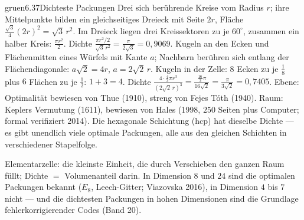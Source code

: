 \begin{loesungkarte}{gruen}{6.37}{Dichteste Packungen}
Drei sich berührende Kreise vom Radius $r$; ihre Mittelpunkte bilden ein gleichseitiges Dreieck mit Seite $2r$, Fläche $\frac{\sqrt3}4(2r)^{2} = \sqrt3\,r^{2}$. Im Dreieck liegen drei Kreissektoren zu je $60^{\circ}$, zusammen ein halber Kreis: $\frac{\pi r^{2}}2$. Dichte $\frac{\pi r^{2}/2}{\sqrt3\,r^{2}} = \frac\pi{2\sqrt3} = 0{,}9069$.
Kugeln an den Ecken und Flächenmitten eines Würfels mit Kante $a$; Nachbarn berühren sich entlang der Flächendiagonale: $a\sqrt2 = 4r$, $a = 2\sqrt2\,r$. Kugeln in der Zelle: $8$ Ecken zu je $\frac18$ plus $6$ Flächen zu je $\frac12$: $1 + 3 = 4$. Dichte $\frac{4\cdot\frac43\pi r^{3}}{(2\sqrt2\,r)^{3}} = \frac{\frac{16}3\pi}{16\sqrt2} = \frac\pi{3\sqrt2} = 0{,}7405$.
Ebene: Optimalität bewiesen von Thue (1910), streng von Fejes Tóth (1940). Raum: Keplers Vermutung (1611), bewiesen von Hales (1998, $250$ Seiten plus Computer; formal verifiziert 2014). Die hexagonale Schichtung (hcp) hat dieselbe Dichte --- es gibt unendlich viele optimale Packungen, alle aus den gleichen Schichten in verschiedener Stapelfolge.
\begin{mitnehmen}\kastentext
Elementarzelle: die kleinste Einheit, die durch Verschieben den ganzen Raum füllt; Dichte $=$ Volumenanteil darin. In Dimension $8$ und $24$ sind die optimalen Packungen bekannt ($E_8$, Leech-Gitter; Viazovska 2016), in Dimension $4$ bis $7$ nicht --- und die dichtesten Packungen in hohen Dimensionen sind die Grundlage fehlerkorrigierender Codes (Band 20).
\end{mitnehmen}
\end{loesungkarte}
